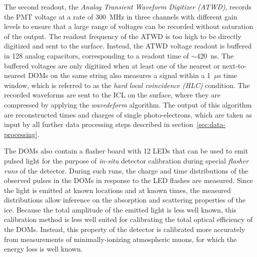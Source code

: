 The second readout, the \emph{Analog Transient Waveform Digitizer (ATWD)}, records the PMT voltage at a rate of 300~MHz in three channels with different gain levels to ensure that a large range of voltages can be recorded without saturation of the output.
The readout frequency of the ATWD is too high to be directly digitized and sent to the surface.
Instead, the ATWD voltage readout is buffered in 128 analog capacitors, corresponding to a readout time of $\sim$420~ns.
The buffered voltages are only digitized when at least one of the nearest or next-to-nearest DOMs on the same string also measures a signal within a 1~$\mu$s time window, which is referred to as the \emph{hard local coincidence (HLC)} condition.
The recorded waveforms are sent to the ICL on the surface, where they are compressed by applying the \emph{wavedeform} algorithm.
The output of this algorithm are reconstructed times and charges of single photo-electrons, which are taken as input by all further data processing steps described in section~\ref{sec:data-processing}.

The DOMs also contain a flasher board with 12 LEDs that can be used to emit pulsed light for the purpose of \emph{in-situ} detector calibration during special \emph{flasher runs} of the detector.
During such runs, the charge and time distributions of the observed pulses in the DOMs in response to the LED flashes are measured.
Since the light is emitted at known locations and at known times, the measured distributions allow inference on the absorption and scattering properties of the ice.
Because the total amplitude of the emitted light is less well known, this calibration method is less well suited for calibrating the total optical efficiency of the DOMs.
Instead, this property of the detector is calibrated more accurately from measurements of minimally-ionizing atmospheric muons, for which the energy loss is well known.
